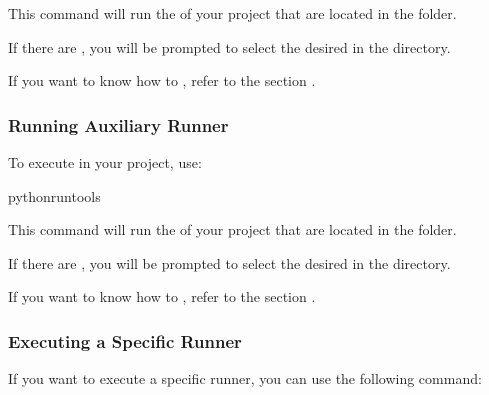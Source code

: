 \documentclass[letterpaper,10pt,english]{sphinxhowto}
\begin{document}
\sphinxAtStartPar
This command will run the  of your project that are located in the  folder.

\sphinxAtStartPar
If there are , you will be prompted to select the desired  in the  directory.

\sphinxAtStartPar
If you want to know how to , refer to the section {\hyperref[\detokenize{architecture/runner/index:id2}]{}}.


\subsubsection{Running Auxiliary Runner}
\label{\detokenize{architecture/runner/index:running-auxiliary-runner}}
\sphinxAtStartPar
To execute  in your project, use:

\begin{sphinxVerbatim}[commandchars=\\\{\}]
pythonrun\PYGZus{}tools
\end{sphinxVerbatim}

\sphinxAtStartPar
This command will run the  of your project that are located in the  folder.

\sphinxAtStartPar
If there are , you will be prompted to select the desired  in the  directory.

\sphinxAtStartPar
If you want to know how to , refer to the section {\hyperref[\detokenize{architecture/runner/index:id2}]{}}.


\subsubsection{Executing a Specific Runner}
\label{\detokenize{architecture/runner/index:id2}}
\sphinxAtStartPar
If you want to execute a specific runner, you can use the following command:
\end{document}
